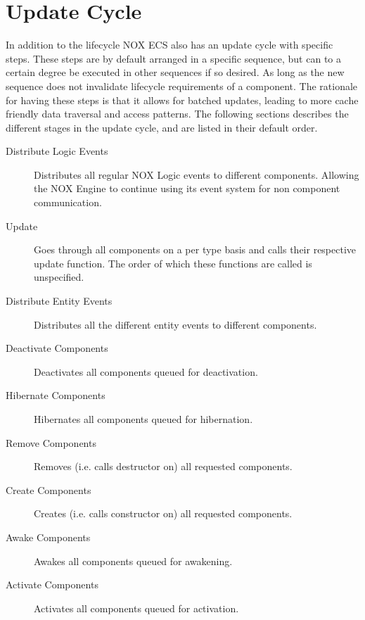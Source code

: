 \section{Update Cycle}
\label{subsec:high_level_update_cycle}
In addition to the lifecycle NOX ECS also has an update cycle with specific steps.
These steps are by default arranged in a specific sequence, but can to a certain degree
be executed in other sequences if so desired.
As long as the new sequence does not invalidate lifecycle requirements of a component.
The rationale for having these steps is that it allows for batched updates,
leading to more cache friendly data traversal and access patterns.
The following sections describes the different stages in the update cycle,
and are listed in their default order.

\begin{description}
    \item
    [Distribute Logic Events]
    Distributes all regular NOX Logic events to different components.
    Allowing the NOX Engine to continue using its event system for non component communication.

    \item
    [Update]
    Goes through all components on a per type basis and calls their respective update function.
    The order of which these functions are called is unspecified.

    \item
    [Distribute Entity Events]
    Distributes all the different entity events to different components.

    \item
    [Deactivate Components]
    Deactivates all components queued for deactivation.

    \item
    [Hibernate Components]
    Hibernates all components queued for hibernation.

    \item
    [Remove Components]
    Removes (i.e. calls destructor on) all requested components.

    \item
    [Create Components]
    Creates (i.e. calls constructor on) all requested components.

    \item
    [Awake Components]
    Awakes all components queued for awakening.

    \item
    [Activate Components]
    Activates all components queued for activation.
\end{description}
